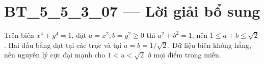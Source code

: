 \documentclass[10pt,a4paper]{article}
\begin{document}
\section*{BT\_5\_5\_3\_07 — Lời giải bổ sung}
Trên biên $x^4+y^4=1$, đặt $a=x^2,b=y^2\ge0$ thì $a^2+b^2=1$, nên $1\le a+b\le\sqrt2$. Hai dấu bằng đạt tại các trục và tại $a=b=1/\sqrt2$. Dữ liệu biên không hằng, nên nguyên lý cực đại mạnh cho $1<u<\sqrt2$ ở mọi điểm trong miền.
\end{document}
